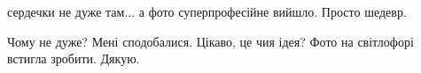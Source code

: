  
 
 
 
 

\qqSecCmt


сердечки не дуже там... а фото суперпрофесійне вийшло. Просто шедевр.


Чому не дуже? Мені сподобалися. Цікаво, це чия ідея? Фото на світлофорі встигла
зробити. Дякую.
